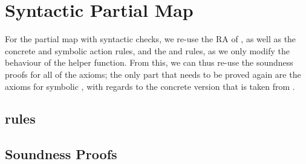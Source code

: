 \section{Syntactic Partial Map} \label{proofs:syntpmap-soundness}

For the partial map with syntactic checks, we re-use the RA of \PMap, as well as the concrete and symbolic action rules, and the \produce{} and \consume{} rules, as we only modify the behaviour of the  helper function. From this, we can thus re-use the soundness proofs for all of the axioms; the only part that needs to be proved again are the axioms for symbolic , with regards to the concrete version that is taken from \PMap.

\subsection{ rules}


\subsection{Soundness Proofs}

